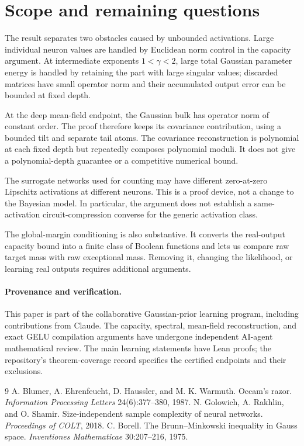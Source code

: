 \documentclass[11pt]{article}
\theoremstyle{remark}\newtheorem{remark}[theorem]{Remark}
\begin{document}
\section{Scope and remaining questions}
The result separates two obstacles caused by unbounded activations. Large individual neuron values are handled by Euclidean norm control in the capacity argument. At intermediate exponents $1<\gamma<2$, large total Gaussian parameter energy is handled by retaining the part with large singular values; discarded matrices have small operator norm and their accumulated output error can be bounded at fixed depth.

At the deep mean-field endpoint, the Gaussian bulk has operator norm of constant order. The proof therefore keeps its covariance contribution, using a bounded tilt and separate tail atoms. The covariance reconstruction is polynomial at each fixed depth but repeatedly composes polynomial moduli. It does not give a polynomial-depth guarantee or a competitive numerical bound.

The surrogate networks used for counting may have different zero-at-zero Lipschitz activations at different neurons. This is a proof device, not a change to the Bayesian model. In particular, the argument does not establish a same-activation circuit-compression converse for the generic activation class.

The global-margin conditioning is also substantive. It converts the real-output capacity bound into a finite class of Boolean functions and lets us compare raw target mass with raw exceptional mass. Removing it, changing the likelihood, or learning real outputs requires additional arguments.

\paragraph{Provenance and verification.}
This paper is part of the collaborative Gaussian-prior learning program, including contributions from Claude. The capacity, spectral, mean-field reconstruction, and exact GELU compilation arguments have undergone independent AI-agent mathematical review. The main learning statements have Lean proofs; the repository's theorem-coverage record specifies the certified endpoints and their exclusions.

\begin{thebibliography}{9}
 A. Blumer, A. Ehrenfeucht, D. Haussler, and M. K. Warmuth. Occam's razor. \emph{Information Processing Letters} 24(6):377--380, 1987.
 N. Golowich, A. Rakhlin, and O. Shamir. Size-independent sample complexity of neural networks. \emph{Proceedings of COLT}, 2018.
 C. Borell. The Brunn--Minkowski inequality in Gauss space. \emph{Inventiones Mathematicae} 30:207--216, 1975.
\end{thebibliography}
\end{document}
